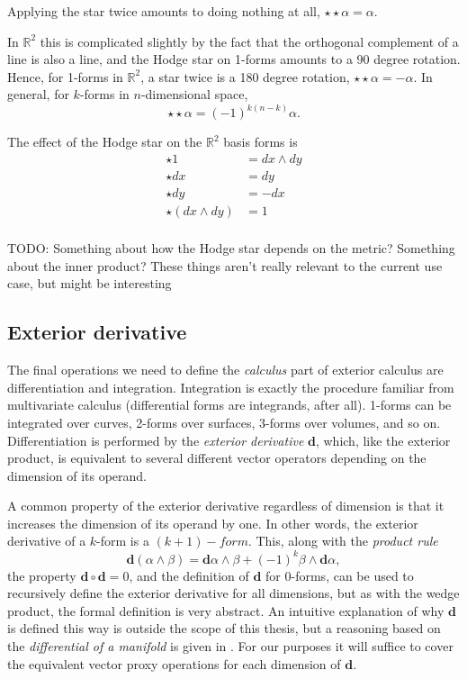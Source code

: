\documentclass[utf8,english]{gradu3}
\begin{document}
Applying the star twice amounts to doing nothing at all,
$\star\star\alpha = \alpha$.

In $\mathbb{R}^2$ this is complicated slightly by the fact that
the orthogonal complement of a line is also a line,
and the Hodge star on 1-forms amounts to a 90 degree rotation.
Hence, for 1-forms in $\mathbb{R}^2$, a star twice is a 180 degree rotation,
$\star\star\alpha = -\alpha$.
In general, for $k$-forms in $n$-dimensional space,
\[
  \star\star\alpha = (-1)^{k(n-k)}\alpha.
\]

The effect of the Hodge star on the $\mathbb{R}^2$ basis forms is
\begin{align*}
  \star 1 &= dx \wedge dy \\
  \star dx &= dy \\
  \star dy &= -dx \\
  \star (dx \wedge dy) &= 1 \\
\end{align*}

TODO: Something about how
the Hodge star depends on the metric?
Something about the inner product?
These things aren't really relevant to the current use case,
but might be interesting


\subsection{Exterior derivative}\label{sec:ext_der}

The final operations we need to define the \textit{calculus} part of exterior calculus
are differentiation and integration.
Integration is exactly the procedure familiar from multivariate calculus
(differential forms are integrands, after all).
1-forms can be integrated over curves, 2-forms over surfaces,
3-forms over volumes, and so on.
Differentiation is performed by the \textit{exterior derivative} $\mathbf{d}$,
which, like the exterior product,
is equivalent to several different vector operators
depending on the dimension of its operand.

A common property of the exterior derivative regardless of dimension
is that it increases the dimension of its operand by one.
In other words, the exterior derivative of a $k$-form is a $(k+1)-form$.
This, along with the \textit{product rule}
\[
  \mathbf{d}(\alpha \wedge \beta)
  = \mathbf{d}\alpha \wedge \beta + (-1)^k \beta \wedge \mathbf{d}\alpha,
\]
the property $\mathbf{d} \circ \mathbf{d} = 0$,
and the definition of $\mathbf{d}$ for 0-forms,
can be used to recursively define the exterior derivative for all dimensions,
but as with the wedge product, the formal definition is very abstract.
An intuitive explanation of why $\mathbf{d}$ is defined this way
is outside the scope of this thesis,
but a reasoning based on the \textit{differential of a manifold}
is given in \cite{crane_digital_2013}.
For our purposes it will suffice to cover the equivalent vector proxy operations
for each dimension of $\mathbf{d}$.
\end{document}
